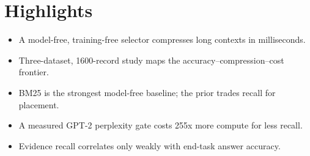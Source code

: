 \documentclass{article}
\begin{document}
\section*{Highlights}
\begin{itemize}
\item A model-free, training-free selector compresses long contexts in milliseconds.
\item Three-dataset, 1600-record study maps the accuracy--compression--cost frontier.
\item BM25 is the strongest model-free baseline; the prior trades recall for placement.
\item A measured GPT-2 perplexity gate costs 255x more compute for less recall.
\item Evidence recall correlates only weakly with end-task answer accuracy.
\end{itemize}
\end{document}
